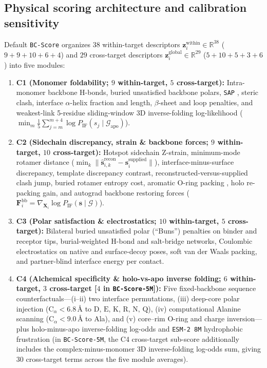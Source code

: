 \documentclass[10pt,twocolumn]{article}
\begin{document}
\subsection{Physical scoring architecture and calibration sensitivity}
Default \texttt{BC-Score} organizes $38$ within-target descriptors $\mathbf{z}_i^{\text{within}} \in \mathbb{R}^{38}$ ($9+9+10+6+4$) and $29$ cross-target descriptors $\mathbf{z}_i^{\text{global}} \in \mathbb{R}^{29}$ ($5+10+5+3+6$) into five modules:
\begin{enumerate}
    \item \textbf{C1 (Monomer foldability; $9$ within-target, $5$ cross-target):} Intra-monomer backbone H-bonds, buried unsatisfied backbone polars, \texttt{SAP} \cite{chennamsetty2009sap}, steric clash, interface $\alpha$-helix fraction and length, $\beta$-sheet and loop penalties, and weakest-link 5-residue sliding-window 3D inverse-folding log-likelihood ($\min_m \frac{1}{5}\sum_{j=m}^{m+4} \log P_{\text{IF}}(s_j \mid \mathcal{G}_{\text{apo}})$).
    \item \textbf{C2 (Sidechain discrepancy, strain \& backbone forces; $9$ within-target, $10$ cross-target):} Hotspot sidechain Z-strain, minimum-mode rotamer distance ($\min_k \|\hat{\mathbf{s}}_{i,k}^{\text{recon}} - \mathbf{s}_i^{\text{supplied}}\|$), interface-minus-surface discrepancy, template discrepancy contrast, reconstructed-versus-supplied clash jump, buried rotamer entropy cost, aromatic O-ring packing \cite{bogan1998anatomy}, holo re-packing gain, and autograd backbone restoring forces ($\mathbf{F}_i^{\text{bb}} = \nabla_{\mathbf{X}_i} \log P_{\text{IF}}(\mathbf{s} \mid \mathcal{G})$).
    \item \textbf{C3 (Polar satisfaction \& electrostatics; $10$ within-target, $5$ cross-target):} Bilateral buried unsatisfied polar (``Buns'') penalties \cite{coventry2021buried} on binder and receptor tips, burial-weighted H-bond and salt-bridge networks, Coulombic electrostatics on native and surface-decoy poses, soft van der Waals packing, and partner-blind interface energy per contact.
    \item \textbf{C4 (Alchemical specificity \& holo-vs-apo inverse folding; $6$ within-target, $3$ cross-target [$4$ in \texttt{BC-Score-5M}]):} Five fixed-backbone sequence counterfactuals---(i--ii) two interface permutations, (iii) deep-core polar injection ($\text{C}_\alpha < 6.8\,\text{\AA}$ to $\text{D, E, K, R, N, Q}$), (iv) computational Alanine scanning ($\text{C}_\alpha < 9.0\,\text{\AA}$ to Ala), and (v) core--rim O-ring and charge inversion---plus holo-minus-apo inverse-folding log-odds and \texttt{ESM-2 8M} \cite{lin2023evolutionary} hydrophobic frustration (in \texttt{BC-Score-5M}, the C4 cross-target sub-score additionally includes the complex-minus-monomer 3D inverse-folding log-odds sum, giving $30$ cross-target terms across the five module averages).

\end{enumerate}
\end{document}
